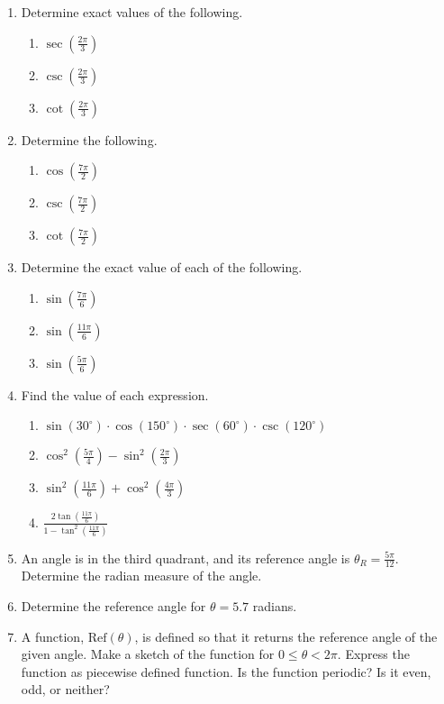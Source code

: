 \begin{enumerate}
\item  Determine exact values of the following.
  \begin{enumerate}
  \item $\sec\left(\frac{2\pi}{3}\right)$
  \item $\csc\left(\frac{2\pi}{3}\right)$
  \item $\cot\left(\frac{2\pi}{3}\right)$
  \end{enumerate}
\item Determine the following.
  \begin{enumerate}
  \item $\cos\left(\frac{7\pi}{2}\right)$
  \item $\csc\left(\frac{7\pi}{2}\right)$
  \item $\cot\left(\frac{7\pi}{2}\right)$
  \end{enumerate}
\item Determine the exact value of each of the following. %
  \begin{enumerate}
  \item $\sin\left(\frac{7\pi}{6}\right)$ 
  \item $\sin\left(\frac{11\pi}{6}\right)$
  \item $\sin\left(\frac{5\pi}{6}\right)$ 
  \end{enumerate}
\item Find the value of each expression.
  \begin{enumerate}
  \item $\sin\left(30^\circ\right)\cdot \cos\left(150^\circ\right)\cdot \sec\left(60^\circ\right)\cdot \csc\left(120^\circ\right)$
  \item $\cos^2\left(\frac{5\pi}{4}\right)-\sin^2\left(\frac{2\pi}{3}\right)$
  \item $\sin^2\left(\frac{11\pi}{6}\right)+\cos^2\left(\frac{4\pi}{3}\right)$
  \item $\displaystyle \frac{2\tan\left(\frac{11\pi}{6}\right)}{1-\tan^2\left(\frac{11\pi}{6}\right)}$
  \end{enumerate}
\item An angle is in the third quadrant, and its reference angle is
  $\theta_R=\frac{5\pi}{12}$. Determine the radian measure of the
  angle.
\item Determine the reference angle for $\theta=5.7$ radians.
\item A function, $\textrm{Ref}(\theta)$, is defined so that it
  returns the reference angle of the given angle. Make a sketch of the
  function for $0\leq\theta < 2\pi$. Express the function as piecewise
  defined function. Is the function periodic? Is it even, odd, or
  neither?


\end{enumerate}
